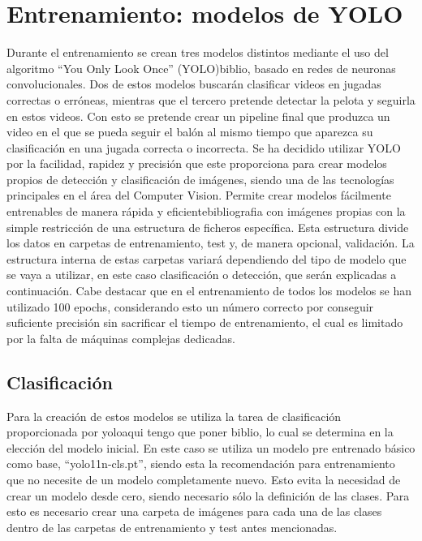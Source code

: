 \documentclass[12pt]{report} %
\begin{document}
    \section{Entrenamiento: modelos de YOLO}

    Durante el entrenamiento se crean tres modelos distintos mediante el uso
    del algoritmo ``You Only Look Once'' (YOLO){biblio}, basado en redes de
    neuronas convolucionales. Dos de estos modelos buscarán clasificar videos
    en jugadas correctas o erróneas, mientras que el tercero pretende detectar
    la pelota y seguirla en estos videos. Con esto se pretende crear un
    pipeline final que produzca un video en el que se pueda seguir el balón al
    mismo tiempo que aparezca su clasificación en una jugada correcta o
    incorrecta.  Se ha decidido utilizar YOLO por la facilidad, rapidez y
    precisión que este proporciona para crear modelos propios de detección y
    clasificación de imágenes, siendo una de las tecnologías principales en el
    área del Computer Vision. Permite crear modelos fácilmente entrenables de
    manera rápida y eficiente{bibliografia} con imágenes propias con la simple
    restricción de una estructura de ficheros específica. Esta estructura
    divide los datos en carpetas de entrenamiento, test y, de manera opcional,
    validación. La estructura interna de estas carpetas variará dependiendo del
    tipo de modelo que se vaya a utilizar, en este caso clasificación o
    detección, que serán explicadas a continuación.  Cabe destacar que en el
    entrenamiento de todos los modelos se han utilizado 100 epochs,
    considerando esto un número correcto por conseguir suficiente precisión sin
    sacrificar el tiempo de entrenamiento, el cual es limitado por la falta de
    máquinas complejas dedicadas.
    
    \subsection{Clasificación}
    Para la creación de estos modelos se utiliza la tarea de clasificación
    proporcionada por yolo{aqui tengo que poner biblio}, lo cual se determina
    en la elección del modelo inicial. En este caso se utiliza un modelo pre
    entrenado básico como base, ``yolo11n-cls.pt'', siendo esta la recomendación
    para entrenamiento que no necesite de un modelo completamente nuevo. Esto
    evita la necesidad de crear un modelo desde cero, siendo necesario sólo la
    definición de las clases. Para  esto es necesario crear una carpeta de
    imágenes para cada una de las clases dentro de las carpetas de
    entrenamiento y test antes mencionadas. 
    
\end{document}
